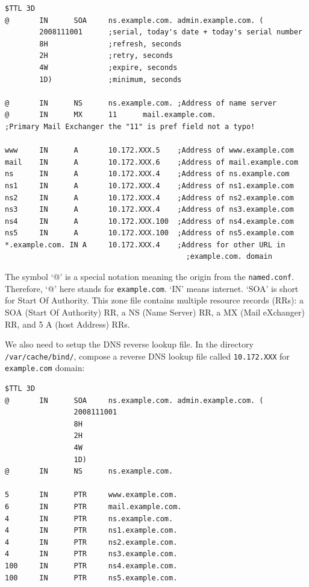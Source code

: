\documentclass{article}
\begin{document}
\begin{verbatim}
$TTL 3D
@       IN      SOA     ns.example.com. admin.example.com. (
        2008111001      ;serial, today's date + today's serial number
        8H              ;refresh, seconds
        2H              ;retry, seconds
        4W              ;expire, seconds
        1D)             ;minimum, seconds

@       IN      NS      ns.example.com.	;Address of name server
@       IN      MX      11      mail.example.com.	
;Primary Mail Exchanger the "11" is pref field not a typo!

www     IN      A       10.172.XXX.5	;Address of www.example.com
mail    IN      A       10.172.XXX.6	;Address of mail.example.com
ns      IN      A       10.172.XXX.4	;Address of ns.example.com
ns1     IN      A       10.172.XXX.4	;Address of ns1.example.com
ns2     IN      A       10.172.XXX.4	;Address of ns2.example.com
ns3     IN      A       10.172.XXX.4	;Address of ns3.example.com
ns4     IN      A       10.172.XXX.100	;Address of ns4.example.com
ns5     IN      A       10.172.XXX.100	;Address of ns5.example.com
*.example.com. IN A     10.172.XXX.4 	;Address for other URL in 
                                          ;example.com. domain
\end{verbatim}

The symbol `@' is a special notation meaning the origin from the {\tt named.conf}. 
Therefore, `@' here stands for {\tt example.com}. `IN' means internet. 
`SOA' is short for Start Of Authority.
This zone file contains multiple resource records (RRs): a SOA (Start Of Authority) RR, 
a NS (Name Server) RR, a MX (Mail eXchanger) RR, and 5 A (host Address) RRs.


We also need to setup the DNS reverse lookup file.
In the directory \texttt{/var/cache/bind/}, compose a reverse DNS lookup file 
called \texttt{10.172.XXX} for \texttt{example.com} domain:
\begin{verbatim}
$TTL 3D
@       IN      SOA     ns.example.com. admin.example.com. (
                2008111001
                8H
                2H
                4W
                1D)
@       IN      NS      ns.example.com.

5       IN      PTR     www.example.com.
6       IN      PTR     mail.example.com.
4       IN      PTR     ns.example.com.
4       IN      PTR     ns1.example.com.
4       IN      PTR     ns2.example.com.
4       IN      PTR     ns3.example.com.
100     IN      PTR     ns4.example.com.
100     IN      PTR     ns5.example.com.
\end{verbatim}
\end{document}
